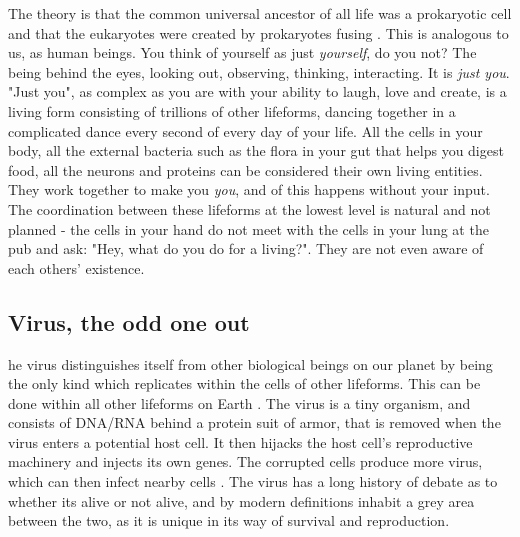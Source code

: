 The theory is that the common universal ancestor of all life was a prokaryotic cell and that the eukaryotes were created by prokaryotes fusing \cite{ProcaEuka}.
This is analogous to us, as human beings.
You think of yourself as just \textit {yourself}, do you not?
The being behind the eyes, looking out, observing, thinking, interacting.
It is \textit{just you}.
"Just you", as complex as you are with your ability to laugh, love and create, is a living form consisting of trillions of other lifeforms, dancing together in a complicated dance every second of every day of your life.
All the cells in your body, all the external bacteria such as the flora in your gut that helps you digest food, all the neurons and proteins can be considered their own living entities.
They work together to make you \textit{you}, and of this happens without your input.
The coordination between these lifeforms at the lowest level is natural and not planned - the cells in your hand do not meet with the cells in your lung at the pub and ask: "Hey, what do you do for a living?".
They are not even aware of each others' existence.

\subsection{Virus, the odd one out}

he virus distinguishes itself from other biological beings on our planet by being the only kind which replicates within the cells of other lifeforms.
This can be done within all other lifeforms on Earth \cite{koonin}.
The virus is a tiny organism, and consists of DNA/RNA behind a protein suit of armor, that is removed when the virus enters a potential host cell.
It then hijacks the host cell's reproductive machinery and injects its own genes.
The corrupted cells produce more virus, which can then infect nearby cells \cite{villareal}.
The virus has a long history of debate as to whether its alive or not alive, and by modern definitions inhabit a grey area between the two, as it is unique in its way of survival and reproduction.